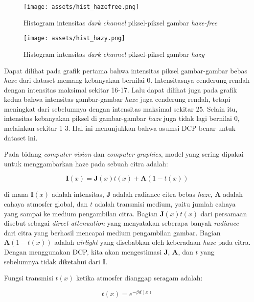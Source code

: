 \documentclass[11pt, a4paper, final]{report}
\begin{document}
\begin{figure}[htbp]
\centering
\texttt{[image: assets/hist\_hazefree.png]}
\caption{Histogram intensitas \textit{dark channel} piksel-piksel gambar \textit{haze-free}}
\end{figure}

\newpage


\begin{figure}[htbp]
\centering
\texttt{[image: assets/hist\_hazy.png]}
\caption{Histogram intensitas \textit{dark channel} piksel-piksel gambar \textit{hazy}}
\end{figure}

\newpage
Dapat dilihat pada grafik pertama bahwa intensitas piksel gambar-gambar bebas \textit{haze} dari dataset memang kebanyakan bernilai 0. Intensitasnya cenderung rendah dengan intensitas maksimal sekitar 16-17. Lalu dapat dilihat juga pada grafik kedua bahwa intensitas gambar-gambar \textit{haze} juga cenderung rendah, tetapi meningkat dari sebelumnya dengan intensitas maksimal sekitar 25. Selain itu, intensitas kebanyakan piksel di gambar-gambar \textit{haze} juga tidak lagi bernilai 0, melainkan sekitar 1-3. Hal ini menunjukkan bahwa asumsi DCP benar untuk dataset ini.

Pada bidang \textit{computer vision} dan \textit{computer graphics}, model yang sering dipakai untuk menggambarkan haze pada sebuah citra adalah:

\begin{equation} \label{eq1}
\mathbf{I}(x) = \mathbf{J}(x)t(x) + \mathbf{A}(1-t(x))
\end{equation}

di mana $\mathbf{I}(x)$ adalah intensitas, $\mathbf{J}$ adalah radiance citra bebas \textit{haze}, $\mathbf{A}$ adalah cahaya atmosfer global, dan $t$ adalah transmisi medium, yaitu jumlah cahaya yang sampai ke medium pengambilan citra. Bagian $\mathbf{J}(x)t(x)$ dari persamaan disebut sebagai \textit{direct attenuation} yang menyatakan seberapa banyak \textit{radiance} dari citra yang berhasil mencapai medium pengambilan gambar. Bagian $\mathbf{A}(1-t(x))$ adalah \textit{airlight} yang disebabkan oleh keberadaan \textit{haze} pada citra. Dengan menggunakan DCP, kita akan mengestimasi $\mathbf{J}$, $\mathbf{A}$, dan $t$ yang sebelumnya tidak diketahui dari $\mathbf{I}$.

Fungsi transmisi $t(x)$ ketika atmosfer dianggap seragam adalah:

\begin{equation} \label{eq2}
t(x)=e^{-\beta d(x)}
\end{equation}
\end{document}
